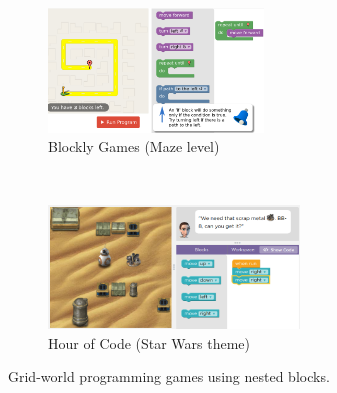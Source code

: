 \begin{figure}[htb]
\centering
\begin{subfigure}[t]{0.43\textwidth}
\centering
\includegraphics[height=33mm]{img/blockly-nested}
\caption{Blockly Games (Maze level)}
\label{fig:blockly-games}
\end{subfigure}%
~
\begin{subfigure}[t]{0.57\textwidth}
\centering
\includegraphics[height=33mm]{img/hour-of-code-sw}
\caption{Hour of Code (Star Wars theme)}
\label{fig:hoc}
\end{subfigure}
\caption{Grid-world programming games using nested blocks.}
\label{fig:blockly-hoc}
\end{figure}



